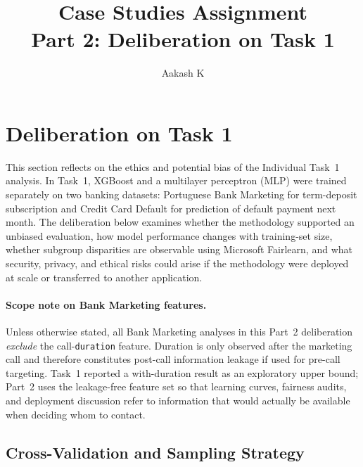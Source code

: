 \documentclass[11pt,a4paper]{article}
\title{Case Studies Assignment\\[0.4em]\large Part 2: Deliberation on Task 1}
\author{Aakash K}
\date{}
\begin{document}
\maketitle
\onehalfspacing

\section{Deliberation on Task 1}
\label{sec:part2-deliberation}

This section reflects on the ethics and potential bias of the Individual Task~1
analysis. In Task~1, XGBoost and a multilayer perceptron (MLP) were trained separately
on two banking datasets: Portuguese Bank Marketing for term-deposit subscription and
Credit Card Default for prediction of default payment next month. The deliberation
below examines whether the methodology supported an unbiased evaluation, how model
performance changes with training-set size, whether subgroup disparities are
observable using Microsoft Fairlearn, and what security, privacy, and ethical risks
could arise if the methodology were deployed at scale or transferred to another
application.

\paragraph{Scope note on Bank Marketing features.}
Unless otherwise stated, all Bank Marketing analyses in this Part~2 deliberation
\emph{exclude} the call-\texttt{duration} feature. Duration is only observed after the
marketing call and therefore constitutes post-call information leakage if used for
pre-call targeting. Task~1 reported a with-duration result as an exploratory upper
bound; Part~2 uses the leakage-free feature set so that learning curves, fairness
audits, and deployment discussion refer to information that would actually be
available when deciding whom to contact.

\subsection{Cross-Validation and Sampling Strategy}
\label{sec:part2-cv}
\end{document}

